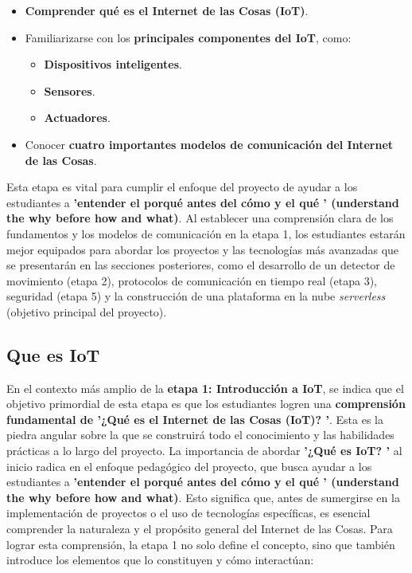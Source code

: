 \documentclass{report}
\begin{document}
\begin{itemize}
    \item \textbf{Comprender qué es el Internet de las Cosas (IoT)}.
    \item Familiarizarse con los \textbf{principales componentes del IoT}, como:
    \begin{itemize}
        \item \textbf{Dispositivos inteligentes}.
        \item \textbf{Sensores}.
        \item \textbf{Actuadores}.
    \end{itemize}
    \item Conocer \textbf{cuatro importantes modelos de comunicación del Internet de las Cosas}.
\end{itemize}
Esta etapa es vital para cumplir el enfoque del proyecto de ayudar a los estudiantes a \textbf{ 'entender el porqué antes del cómo y el qué ' 
(understand the why before how and what)}. Al establecer una comprensión clara de los fundamentos y los modelos de comunicación en la etapa 1, 
los estudiantes estarán mejor equipados para abordar los proyectos y las tecnologías más avanzadas que se presentarán en las secciones posteriores, como 
el desarrollo de un detector de movimiento (etapa 2), protocolos de comunicación en tiempo real (etapa 3), seguridad (etapa 5) y la 
construcción de una plataforma en la nube \textit{serverless} (objetivo principal del proyecto).

\subsection{Que es IoT}
En el contexto más amplio de la \textbf{etapa 1: Introducción a IoT}, se  indica que el objetivo primordial de esta etapa es que los 
estudiantes logren una \textbf{comprensión fundamental de  '¿Qué es el Internet de las Cosas (IoT)? '}. Esta es la piedra angular sobre la que se construirá 
todo el conocimiento y las habilidades prácticas a lo largo del proyecto. La importancia de abordar \textbf{ '¿Qué es IoT? '} al inicio radica en el enfoque 
pedagógico del proyecto, que busca ayudar a los estudiantes a \textbf{ 'entender el porqué antes del cómo y el qué ' (understand the why before how and what)}. 
Esto significa que, antes de sumergirse en la implementación de proyectos o el uso de tecnologías específicas, es esencial comprender la naturaleza y el 
propósito general del Internet de las Cosas. Para lograr esta comprensión, la etapa 1 no solo define el concepto, sino que también introduce los elementos 
que lo constituyen y cómo interactúan:
\end{document}
